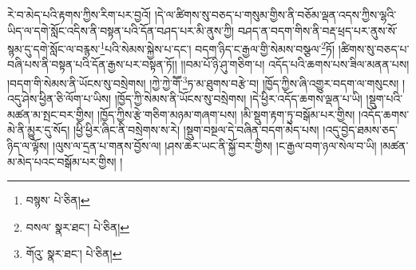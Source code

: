 རེ་བ་མེད་པའི་རྟགས་ཀྱིས་རིག་པར་བྱའོ། །དེ་ལ་ཚིགས་སུ་བཅད་པ་གསུམ་གྱིས་ནི་བཅོམ་ལྡན་འདས་ཀྱིས་ལྷའི་ཡིད་ལ་དགེ་སློང་འདིས་ནི་བསྟན་པའི་དོན་བཤད་པར་མི་ནུས་ཀྱི། བཤད་ན་བདག་གིས་ནི་བརྡ་ཕྲད་པར་ནུས་སོ་སྙམ་དུ་དགེ་སློང་ལ་བརྙས་\footnote{བསྙས་  པེ་ཅིན། }པའི་སེམས་སྐྱེས་པ་དང་། བདག་ཉིད་ང་རྒྱལ་གྱི་སེམས་བསྩལ་\footnote{བསལ་  སྣར་ཐང་།  པེ་ཅིན། }ཏོ། །ཚིགས་སུ་བཅད་པ་བཞི་པས་ནི་བསྟན་པའི་དོན་རྒྱས་པར་བསྟན་ཏོ།། །།བམ་པོ་ཉི་ཤུ་གཅིག་པ། འདོད་པའི་ཆགས་པས་ཟིལ་མནན་པས། །བདག་གི་སེམས་ནི་ཡོངས་སུ་བསྲེགས། །ཀྱེ་ཀྱེ་གཽ་\footnote{གོའུ་  སྣར་ཐང་།  པེ་ཅིན། }ཏ་མ་ཐུགས་བརྩེ་བ། །ཁྱོད་ཀྱིས་ཞི་འགྱུར་བདག་ལ་གསུངས། །འདུ་ཤེས་ཕྱིན་ཅི་ལོག་པ་ཡིས། །ཁྱོད་ཀྱི་སེམས་ནི་ཡོངས་སུ་བསྲེགས། །དེ་ཕྱིར་འདོད་ཆགས་ལྡན་པ་ཡི། །སྡུག་པའི་མཚན་མ་སྤང་བར་གྱིས། །ཁྱོད་ཀྱིས་རྩེ་གཅིག་མཉམ་གཞག་པས། །མི་སྡུག་རྟག་ཏུ་བསྒོམ་པར་གྱིས། །འདོད་ཆགས་མེ་ནི་མྱུར་དུ་སོད། །ཕྱི་ཕྱིར་ཞིང་ནི་བསྲེགས་ས་རེ། །སྡུག་བསྔལ་དེ་བཞིན་བདག་མེད་པས། །འདུ་བྱེད་ཐམས་ཅད་ཉིད་ལ་ལྟོས། །ལུས་ལ་དྲན་པ་གནས་བྱོས་ལ། །ཤས་ཆེར་ཡང་ནི་སྐྱོ་བར་གྱིས། །ང་རྒྱལ་བག་ཉལ་སེལ་བ་ཡི། །མཚན་མ་མེད་པའང་བསྒོམ་པར་གྱིས། །
